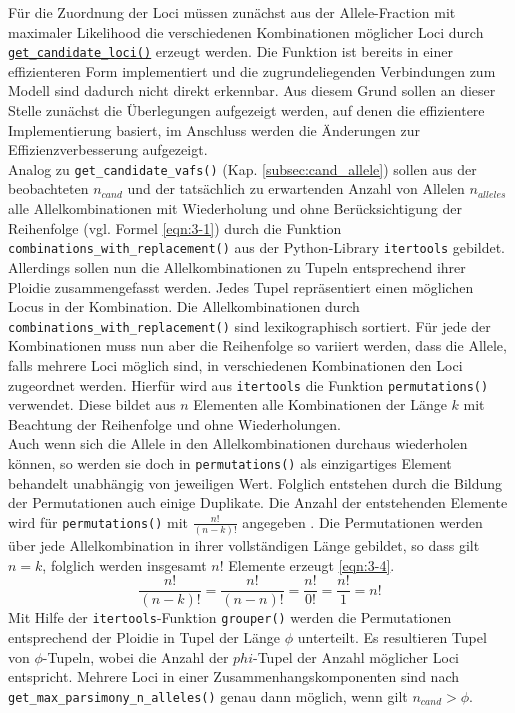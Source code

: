 Für die Zuordnung der Loci müssen zunächst aus der Allele-Fraction mit maximaler Likelihood die  verschiedenen Kombinationen möglicher Loci durch \hyperref[schritt13]{\lstinline|get_candidate_loci()|\label{schritt13txt}} erzeugt werden. Die Funktion ist bereits in einer effizienteren Form implementiert und die zugrundeliegenden Verbindungen zum Modell sind dadurch nicht direkt erkennbar. Aus diesem Grund sollen an dieser Stelle zunächst die Überlegungen aufgezeigt werden, auf denen die effizientere Implementierung basiert, im Anschluss werden die Änderungen zur Effizienzverbesserung aufgezeigt. \\

Analog zu \lstinline|get_candidate_vafs()| (Kap. \ref{subsec:cand_allele}) sollen aus der beobachteten $n_{cand} $ und der tatsächlich zu erwartenden Anzahl von Allelen $n_{alleles}$ alle Allelkombinationen mit Wiederholung und ohne Berücksichtigung der Reihenfolge  (vgl. Formel \eqref{eqn:3-1}) durch die Funktion \lstinline|combinations_with_replacement()| aus der Python-Library \lstinline|itertools| gebildet. Allerdings sollen nun die Allelkombinationen zu Tupeln entsprechend ihrer Ploidie zusammengefasst werden. Jedes Tupel repräsentiert einen möglichen Locus in der Kombination. Die Allelkombinationen durch \lstinline|combinations_with_replacement()| sind lexikographisch sortiert. Für jede der Kombinationen muss nun aber die Reihenfolge so variiert werden, dass die Allele, falls mehrere Loci möglich sind, in verschiedenen Kombinationen den Loci zugeordnet werden. Hierfür wird aus \lstinline|itertools| die Funktion \lstinline|permutations()| verwendet. Diese bildet aus $ n $ Elementen alle Kombinationen der Länge $ k $ mit Beachtung der Reihenfolge und ohne Wiederholungen.\\

Auch wenn sich die Allele in den Allelkombinationen durchaus wiederholen können, so werden sie doch in \lstinline|permutations()| als einzigartiges Element behandelt unabhängig von jeweiligen Wert. Folglich entstehen durch die Bildung der Permutationen auch einige Duplikate. Die Anzahl der entstehenden Elemente wird für \lstinline|permutations()| mit  $ \frac{n!}{(n-k)!} $ angegeben \cite{itertools}. Die Permutationen werden über jede Allelkombination in ihrer vollständigen Länge gebildet, so dass gilt $ n = k $, folglich werden insgesamt $ n! $ Elemente erzeugt \eqref{eqn:3-4}. 
\begin{equation} \label{eqn:3-4}
\tag{3-4}
\frac{n!}{(n-k)!}=\frac{n!}{(n-n)!}=\frac{n!}{0!}=\frac{n!}{1}=n!
\end{equation}
Mit Hilfe der \lstinline|itertools|-Funktion \lstinline|grouper()| werden die Permutationen entsprechend der Ploidie in Tupel der Länge $\phi$ unterteilt. Es resultieren Tupel von $ \phi $-Tupeln, wobei die Anzahl der $phi$-Tupel der Anzahl möglicher Loci entspricht. Mehrere Loci in einer Zusammenhangskomponenten sind nach \lstinline|get_max_parsimony_n_alleles()| genau dann möglich, wenn gilt $n_{cand} > \phi $.\\

